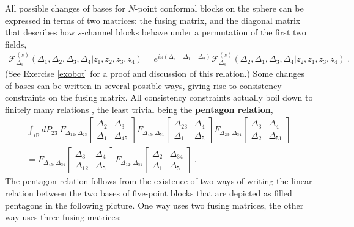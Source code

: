\documentclass[12pt, a4paper, notitlepage, twoside]{report}
\numberwithin{equation}{section}
\theoremstyle{break}
\begin{document}
All possible changes of bases for $N$-point conformal blocks on the sphere can be expressed in terms of two matrices: the fusing matrix, and the diagonal matrix that describes how $s$-channel blocks behave under a permutation of the first two fields,
\begin{align}
 \mathcal{F}^{(s)}_{\Delta_s}(\Delta_1,\Delta_2,\Delta_3,\Delta_4|z_1,z_2,z_3,z_4) = e^{i\pi(\Delta_s-\Delta_1-\Delta_2)} \mathcal{F}^{(s)}_{\Delta_s}(\Delta_2,\Delta_1,\Delta_3,\Delta_4|z_2,z_1,z_3,z_4)\ .
 \label{eq:bot}
\end{align}
(See Exercise \ref{exobot} for a proof and discussion of this relation.)
Some changes of bases can be written in several possible ways, giving rise to consistency constraints on the fusing matrix. All consistency constraints actually boil down to finitely many relations \cite{ms89b}, the least trivial being 
the \textbf{pentagon relation}, 
\begin{multline}
 \int_{i\mathbb{R}} dP_{23}\ 
 F_{\Delta_{12},\Delta_{23}}\begin{bmatrix} \Delta_2 & \Delta_3 \\ \Delta_1 & \Delta_{45} \end{bmatrix}
 F_{\Delta_{45},\Delta_{51}}\begin{bmatrix} \Delta_{23} & \Delta_4 \\ \Delta_1 & \Delta_5 \end{bmatrix}
 F_{\Delta_{23},\Delta_{34}}\begin{bmatrix} \Delta_3 & \Delta_4 \\ \Delta_2 & \Delta_{51} \end{bmatrix}
 \\
 = 
 F_{\Delta_{45},\Delta_{34}}\begin{bmatrix} \Delta_3 & \Delta_4 \\ \Delta_{12} & \Delta_5 \end{bmatrix}
 F_{\Delta_{12},\Delta_{51}}\begin{bmatrix} \Delta_2 & \Delta_{34} \\ \Delta_1 & \Delta_5 \end{bmatrix}
 \ .
\end{multline}
The pentagon relation follows from the existence of two ways of writing the linear relation between the two bases of five-point blocks that are depicted as filled pentagons in the following picture. One way uses two fusing matrices, the other way uses three fusing matrices:
\end{document}

